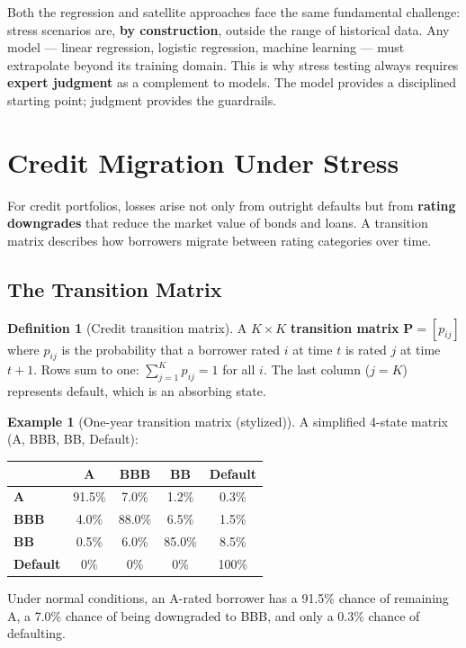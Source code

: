 \documentclass[11pt, a4paper]{article}
\theoremstyle{definition}
\newtheorem{definition}{Definition}[section]
\newtheorem{example}{Example}[section]
\theoremstyle{plain}
\theoremstyle{remark}
\begin{document}
\begin{keyresult}
Both the regression and satellite approaches face the same fundamental challenge:
stress scenarios are, \textbf{by construction}, outside the range of historical data.
Any model --- linear regression, logistic regression, machine learning ---
must extrapolate beyond its training domain.
This is why stress testing always requires \textbf{expert judgment} as a complement to models.
The model provides a disciplined starting point; judgment provides the guardrails.
\end{keyresult}

\section{Credit Migration Under Stress}
\label{sec:migration}

For credit portfolios, losses arise not only from outright defaults
but from \textbf{rating downgrades} that reduce the market value of bonds and loans.
A transition matrix describes how borrowers migrate between rating categories over time.

\subsection{The Transition Matrix}

\begin{definition}[Credit transition matrix]
A $K \times K$ \textbf{transition matrix} $\bm{P} = [p_{ij}]$ where $p_{ij}$ is the probability
that a borrower rated $i$ at time $t$ is rated $j$ at time $t+1$.
Rows sum to one: $\sum_{j=1}^{K} p_{ij} = 1$ for all $i$.
The last column ($j = K$) represents default, which is an absorbing state.
\end{definition}

\begin{example}[One-year transition matrix (stylized)]\label{ex:transition}
A simplified 4-state matrix (A, BBB, BB, Default):

\begin{center}
\begin{tabular}{@{}lcccc@{}}
\toprule
& \textbf{A} & \textbf{BBB} & \textbf{BB} & \textbf{Default} \\
\midrule
\textbf{A}   & 91.5\% & 7.0\% & 1.2\% & 0.3\% \\
\textbf{BBB} & 4.0\%  & 88.0\% & 6.5\% & 1.5\% \\
\textbf{BB}  & 0.5\%  & 6.0\%  & 85.0\% & 8.5\% \\
\textbf{Default} & 0\% & 0\% & 0\% & 100\% \\
\bottomrule
\end{tabular}
\end{center}

Under normal conditions, an A-rated borrower has a 91.5\% chance of remaining A,
a 7.0\% chance of being downgraded to BBB, and only a 0.3\% chance of defaulting.
\end{example}
\end{document}

